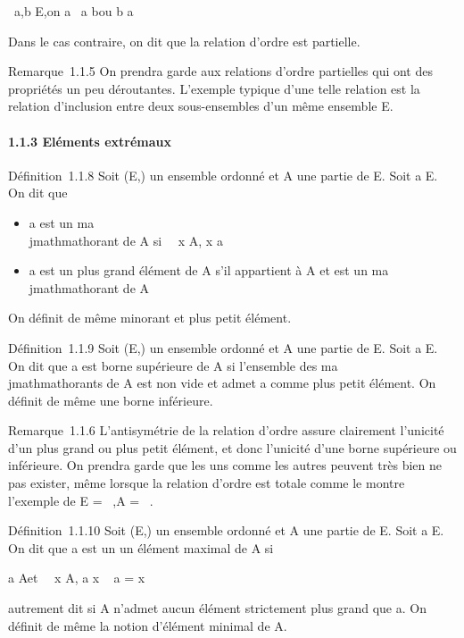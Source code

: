 \forall~a,b \in E,\text on a ~a \leqslant
b\text ou b \leqslant a

Dans le cas contraire, on dit que la relation d'ordre est partielle.

Remarque~1.1.5 On prendra garde aux relations d'ordre partielles qui ont
des propriétés un peu déroutantes. L'exemple typique d'une telle
relation est la relation d'inclusion entre deux sous-ensembles d'un même
ensemble E.

\paragraph{1.1.3 Eléments extrémaux}

Définition~1.1.8 Soit (E,\leqslant) un ensemble ordonné et A une partie de E.
Soit a \in E. On dit que

\begin{itemize}
\itemsep1pt\parskip0pt
\item
  a est un ma\\jmathmathorant de A si \forall~~x \in A, x \leqslant a
\item
  a est un plus grand élément de A s'il appartient à A et est un
  ma\\jmathmathorant de A
\end{itemize}

On définit de même minorant et plus petit élément.

Définition~1.1.9 Soit (E,\leqslant) un ensemble ordonné et A une partie de E.
Soit a \in E. On dit que a est borne supérieure de A si l'ensemble des
ma\\jmathmathorants de A est non vide et admet a comme plus petit élément. On
définit de même une borne inférieure.

Remarque~1.1.6 L'antisymétrie de la relation d'ordre assure clairement
l'unicité d'un plus grand ou plus petit élément, et donc l'unicité d'une
borne supérieure ou inférieure. On prendra garde que les uns comme les
autres peuvent très bien ne pas exister, même lorsque la relation
d'ordre est totale comme le montre l'exemple de E = ~,A = ~.

Définition~1.1.10 Soit (E,\leqslant) un ensemble ordonné et A une partie de E.
Soit a \in E. On dit que a est un un élément maximal de A si

a \in A\text et \quad
\forall~~x \in A, a \leqslant x \rigtharrow~ a = x

autrement dit si A n'admet aucun élément strictement plus grand que a.
On définit de même la notion d'élément minimal de A.

